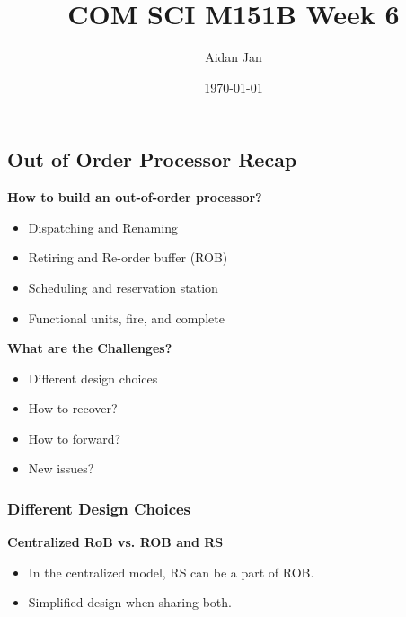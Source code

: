 \documentclass[10pt]{article}
\title{COM SCI M151B Week 6}
\author{Aidan Jan}
\date{\today}
\begin{document}
\maketitle

\subsection*{Out of Order Processor Recap}
\textbf{How to build an out-of-order processor?}
\begin{itemize}
    \item Dispatching and Renaming
    \item Retiring and Re-order buffer (ROB)
    \item Scheduling and reservation station
    \item Functional units, fire, and complete
\end{itemize}
\textbf{What are the Challenges?}
\begin{itemize}
    \item Different design choices
    \item How to recover?
    \item How to forward?
    \item New issues?
\end{itemize}
\subsubsection*{Different Design Choices}
\textbf{Centralized RoB vs. ROB and RS}
\begin{itemize}
    \item In the centralized model, RS can be a part of ROB.
    \item Simplified design when sharing both.
\end{itemize}
\end{document}
